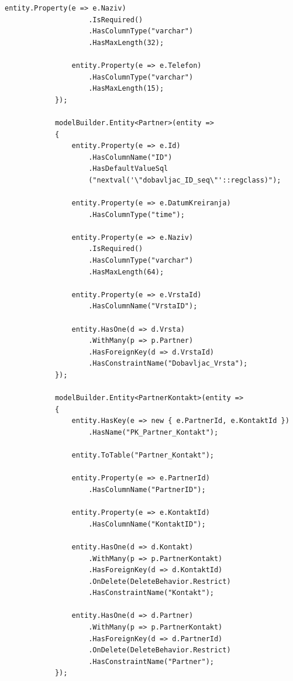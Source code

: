 \documentclass[a4paper,12pt]{foi}
\begin{document}
\begin{lstlisting}[language={[Sharp]C}]
                entity.Property(e => e.Naziv)
                    .IsRequired()
                    .HasColumnType("varchar")
                    .HasMaxLength(32);

                entity.Property(e => e.Telefon)
                    .HasColumnType("varchar")
                    .HasMaxLength(15);
            });

            modelBuilder.Entity<Partner>(entity =>
            {
                entity.Property(e => e.Id)
                    .HasColumnName("ID")
                    .HasDefaultValueSql
                    ("nextval('\"dobavljac_ID_seq\"'::regclass)");

                entity.Property(e => e.DatumKreiranja)
                	.HasColumnType("time");

                entity.Property(e => e.Naziv)
                    .IsRequired()
                    .HasColumnType("varchar")
                    .HasMaxLength(64);

                entity.Property(e => e.VrstaId)
                	.HasColumnName("VrstaID");

                entity.HasOne(d => d.Vrsta)
                    .WithMany(p => p.Partner)
                    .HasForeignKey(d => d.VrstaId)
                    .HasConstraintName("Dobavljac_Vrsta");
            });

            modelBuilder.Entity<PartnerKontakt>(entity =>
            {
                entity.HasKey(e => new { e.PartnerId, e.KontaktId })
                    .HasName("PK_Partner_Kontakt");

                entity.ToTable("Partner_Kontakt");

                entity.Property(e => e.PartnerId)
                	.HasColumnName("PartnerID");

                entity.Property(e => e.KontaktId)
                	.HasColumnName("KontaktID");

                entity.HasOne(d => d.Kontakt)
                    .WithMany(p => p.PartnerKontakt)
                    .HasForeignKey(d => d.KontaktId)
                    .OnDelete(DeleteBehavior.Restrict)
                    .HasConstraintName("Kontakt");

                entity.HasOne(d => d.Partner)
                    .WithMany(p => p.PartnerKontakt)
                    .HasForeignKey(d => d.PartnerId)
                    .OnDelete(DeleteBehavior.Restrict)
                    .HasConstraintName("Partner");
            });


\end{lstlisting}
\end{document}

